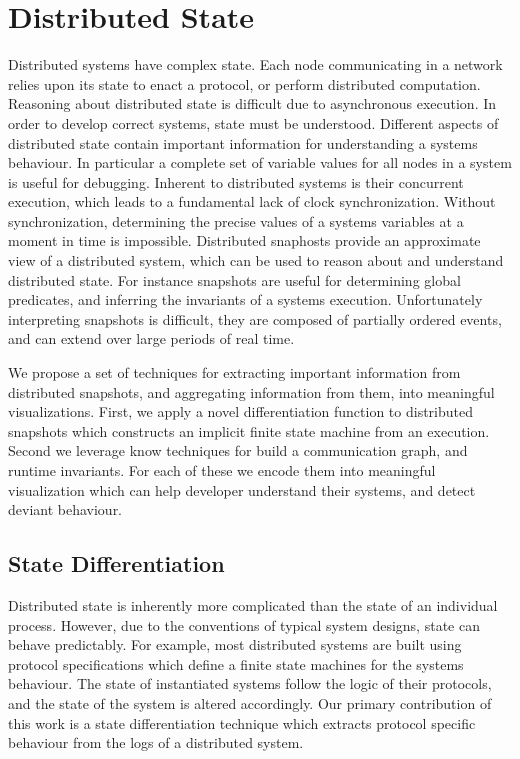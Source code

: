 \section{Distributed State}
\label{sec:distributed-state}


Distributed systems have complex state. Each node communicating in a network
relies upon its state to enact a protocol, or perform distributed computation.
Reasoning about distributed state is difficult due to asynchronous execution. In
order to develop correct systems, state must be understood. Different aspects of
distributed state contain important information for understanding a systems
behaviour. In particular a complete set of variable values for all nodes in a
system is useful for debugging. Inherent to distributed systems is their
concurrent execution, which leads to a fundamental lack of clock
synchronization. Without synchronization, determining the precise values of a
systems variables at a moment in time is impossible. Distributed snaphosts
provide an approximate view of a distributed system, which can be used to reason
about and understand distributed state. For instance snapshots are useful for
determining global predicates, and inferring the invariants of a systems
execution. Unfortunately interpreting snapshots is difficult, they are composed
of partially ordered events, and can extend over large periods of real time.

We propose a set of techniques for extracting important information from
distributed snapshots, and aggregating information from them, into meaningful
visualizations. First, we apply a novel differentiation function to distributed
snapshots which constructs an implicit finite state machine from an execution.
Second we leverage know techniques for build a communication graph, and runtime
invariants. For each of these we encode them into meaningful visualization
which can help developer understand their systems, and detect deviant
behaviour.

\subsection{State Differentiation}

Distributed state is inherently more complicated than the state of an
individual process. However, due to the conventions of typical system designs,
state can behave predictably. For example, most distributed systems are built
using protocol specifications which define a finite state machines for the
systems behaviour. The state of instantiated systems follow the logic of their
protocols, and the state of the system is altered accordingly. Our primary
contribution of this work is a state differentiation technique which extracts
protocol specific behaviour from the logs of a distributed system.

